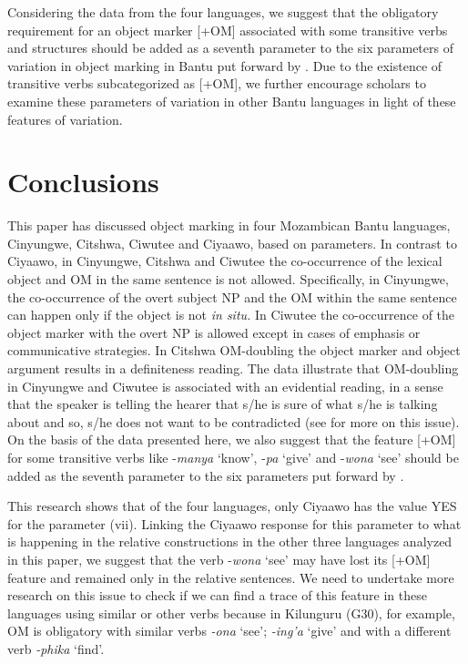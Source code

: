 \documentclass[output=paper]{langscibook}
\begin{document}
Considering the data from the four languages, we suggest that the obligatory requirement for an object marker [+OM] associated with some transitive verbs and structures should be added as a seventh parameter to the six parameters of variation in object marking in Bantu put forward by \citet{MartenKula2012}. Due to the existence of transitive verbs subcategorized as [+OM], we further encourage scholars to examine these parameters of variation in other Bantu languages in light of these features of variation.


\section{Conclusions}\label{sec:ngunga:4}

This paper has discussed object marking in four Mozambican Bantu languages, Cinyungwe, Citshwa, Ciwutee and Ciyaawo, based on  parameters. In contrast to Ciyaawo, in Cinyungwe, Citshwa and Ciwutee the co-occurrence of the lexical object and OM in the same sentence is not allowed. Specifically, in Cinyungwe, the co-occurrence of the overt subject NP and the OM within the same sentence can happen only if the object is not \textit{in situ.} In Ciwutee the co-occurrence of the object marker with the overt NP is allowed except in cases of emphasis or communicative strategies. In Citshwa OM-doubling the object marker and object argument results in a definiteness reading. The data illustrate that OM-doubling in Cinyungwe and Ciwutee is associated with an evidential reading, in a sense that the speaker is telling the hearer that s/he is sure of what s/he is talking about and so, s/he does not want to be contradicted (see \citealt{LippardEtAl2021} for more on this issue). On the basis of the data presented here, we also suggest that the feature [+OM] for some transitive verbs like -\textit{manya} ‘know’, -\textit{pa} ‘give’ and -\textit{wona} ‘see’ should be added as the seventh parameter to the six parameters put forward by \citet{MartenKula2012}. 

This research shows that of the four languages, only Ciyaawo has the value YES for the parameter (vii). Linking the Ciyaawo response for this parameter to what is happening in the relative constructions in the other three languages analyzed in this paper, we suggest that the verb -\textit{wona} ‘see’ may have lost its [+OM] feature and remained only in the relative sentences. We need to undertake more research on this issue to check if we can find a trace of this feature in these languages using similar or other verbs because in Kilunguru (G30), for example, OM is obligatory with similar verbs \textit{{}-ona} ‘see’; \textit{{}-ing’a} ‘give’ and with a different verb \textit{{}-phika} ‘find’. 
\end{document}

